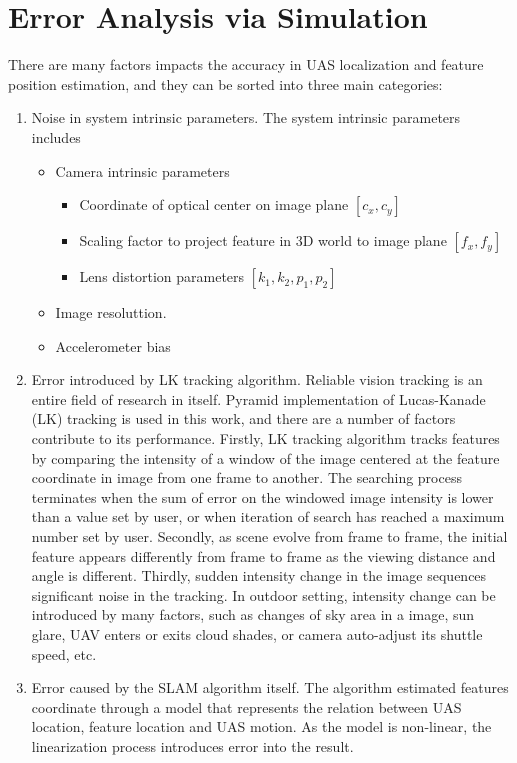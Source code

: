 \chapter{Error Analysis via Simulation}\label{ch:simulation}
There are many factors impacts the accuracy in UAS localization and 
feature position estimation, and they can be sorted into three main 
categories: 

\begin{enumerate}
  \item Noise in system intrinsic parameters. The system intrinsic
  parameters includes
  \begin{itemize}
    \item Camera intrinsic parameters
    \begin{itemize}
      \item Coordinate of optical center on image plane $[c_{x}, c_{y}]$
      \item Scaling factor to project feature in 3D world to image
      plane $ [f_{x}, f_{y}]$
      \item Lens distortion parameters $[k_{1}, k_{2}, p_{1}, p_{2}]$
    \end{itemize}
    \item Image resoluttion.
    \item Accelerometer bias 
  \end{itemize}
  \item Error introduced by LK tracking algorithm. Reliable vision
  tracking is an entire field of research in itself. Pyramid
  implementation of Lucas-Kanade (LK) tracking is used in this work,
  and there are a number of factors contribute to its performance.
  Firstly, LK tracking algorithm tracks features by comparing the
  intensity of a window of the image centered at the feature
  coordinate in image from one frame to another. The searching process
  terminates when the sum of error on the windowed image intensity is
  lower than a value set by user, or when iteration of search has
  reached a maximum number set by user. Secondly, as scene evolve from
  frame to frame, the initial feature appears differently from frame
  to frame as the viewing distance and angle is different. Thirdly,
  sudden intensity change in the image sequences significant noise in
  the tracking. In outdoor setting, intensity change can be introduced
  by many factors, such as changes of sky area in a image, sun glare,
  UAV enters or exits cloud shades, or camera auto-adjust its shuttle
  speed, etc.
  \item Error caused by the SLAM algorithm itself. The algorithm
  estimated features coordinate through a model that represents the
  relation between UAS location, feature location and UAS motion. As
  the model is non-linear, the linearization process introduces error
  into the result.
\end{enumerate}

